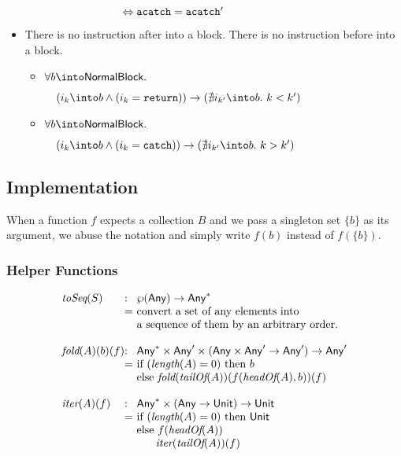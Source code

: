 \begin{itemize}
\begin{itemize}
$\phantom{\quad\call = \call' }\Leftrightarrow \acatch = \acatch'$
\end{itemize}

\item There is no instruction after  into a block. There is no instruction before  into a block.
\begin{itemize}
\item $\forall b \into \NormalBlock.$

$\quad(i_k \into b \wedge (i_k = \TT{return})) \rightarrow (\nexists i_{k'} \into b.\ k < k')$
\item $\forall b \into \NormalBlock.$

$\quad(i_k \into b \wedge (i_k = \TT{catch})) \rightarrow (\nexists i_{k'} \into b.\ k > k')$
\end{itemize}
\end{itemize}

\subsection{\CFG Implementation}
When a function $f$ expects a collection $B$ and we pass a singleton set $\{b\}$
as its argument, we abuse the notation and simply write $f(b)$ instead of $f(\{b\})$.

\subsubsection{Helper Functions}
\[
\begin{array}{l@{}l@{~}l}
\toSeq(S) & : & \powerset{\Any} \rightarrow \Any^{*}\\
& = & \text{convert a set of any elements into}\\
& & \text{a sequence of them by an arbitrary order.}\\
& & \\

\fold(A)(b)(f) & : & \Any^{*} \times \Any' \times (\Any \times \Any' \rightarrow \Any') \rightarrow \Any'\\
& = & \mbox{if}\ (\length(A) = 0)\ \mbox{then}\ b \\
& & \mbox{else}\ \fold(\tailOf(A))(f(\headOf(A),b))(f)\\
& & \\

\iter(A)(f) & : & \Any^{*} \times (\Any \rightarrow \Unit) \rightarrow \Unit\\
& = & \mbox{if}\ (\length(A) = 0)\ \mbox{then}\ \Unit \\
& & \mbox{else}\ f(\headOf(A))\\
& & \phantom{else} \iter(\tailOf(A))(f)\\
\end{array}
\]

